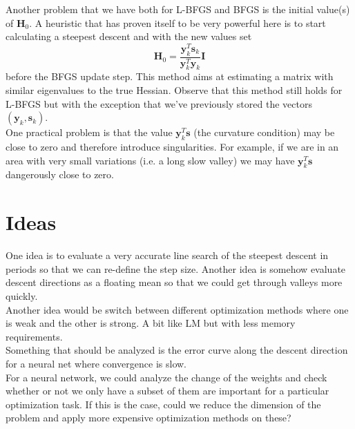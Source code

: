 \documentclass[a4paper,10pt]{article}
\theoremstyle{definition}
\begin{document}
Another problem that we have both for L-BFGS and BFGS is the initial value(s) of $\pmb{H}_0$. A heuristic that has proven itself to be very powerful here is to start calculating a steepest descent and with the new values set
\begin{equation}
	\pmb{H}_0 = \frac{\pmb{y}_k^T\pmb{s}_k}{\pmb{y}^T_k\pmb{y}_k} \pmb{I}
\end{equation} 
before the BFGS update step. This method aims at estimating a matrix with similar eigenvalues to the true Hessian. Observe that this method still holds for L-BFGS but with the exception that we've previously stored the vectors $(\pmb{y}_k, \pmb{s}_k)$.\\

One practical problem is that the value $\pmb{y}_k^T\pmb{s}$ (the curvature condition) may be close to zero and therefore introduce singularities. For example, if we are in an area with very small variations (i.e. a long slow valley) we may have $\pmb{y}_k^T\pmb{s}$ dangerously close to zero.

\section{Ideas}
One idea is to evaluate a very accurate line search of the steepest descent in periods so that we can re-define the step size. Another idea is somehow evaluate descent directions as a floating mean so that we could get through valleys more quickly.\\

Another idea would be switch between different optimization methods where one is weak and the other is strong. A bit like LM but with less memory requirements.\\

Something that should be analyzed is the error curve along the descent direction for a neural net where convergence is slow.\\

For a neural network, we could analyze the change of the weights and check whether or not we only have a subset of them are important for a particular optimization task. If this is the case, could we reduce the dimension of the problem and apply more expensive optimization methods on these?\\
\end{document}
